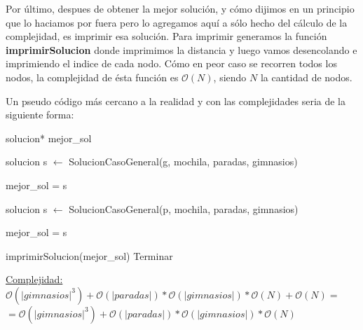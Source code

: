 Por último, despues de obtener la mejor solución, y cómo dijimos en un principio que lo haciamos por fuera pero lo agregamos aquí a sólo hecho del cálculo de la complejidad, es imprimir esa solución. Para imprimir generamos la función \textbf{imprimirSolucion} donde imprimimos la distancia y luego vamos desencolando e imprimiendo el indice de cada nodo. Cómo en peor caso se recorren todos los nodos, la complejidad de ésta función es $\mathcal{O}(N)$, siendo $N$ la cantidad de nodos.

Un pseudo código más cercano a la realidad y con las complejidades seria de la siguiente forma:

\begin{algorithm}[H]
\label{}
\begin{algorithmic}[]

\State solucion* mejor\_sol 

 

	 

		\State solucion s $\leftarrow$ SolucionCasoGeneral(g, mochila, paradas, gimnasios) 

		 
			\State mejor\_sol = s 
		\EndIf
	
	\EndFor

\Else

	 

		\State solucion s $\leftarrow$ SolucionCasoGeneral(p, mochila, paradas, gimnasios) 

		 
			\State mejor\_sol = s 
		\EndIf

	\EndFor


\EndIf

\State imprimirSolucion(mejor\_sol) 
\State Terminar

\medskip
\Statex \underline{Complejidad: $\mathcal{O}(|gimnasios|^3) + \mathcal{O}(|paradas|) * \mathcal{O}(|gimnasios|) * \mathcal{O}(N) + \mathcal{O}(N) = $}
\Statex \underline{$ = \mathcal{O}(|gimnasios|^3) + \mathcal{O}(|paradas|) * \mathcal{O}(|gimnasios|) * \mathcal{O}(N)$}
\end{algorithmic}
\end{algorithm}


